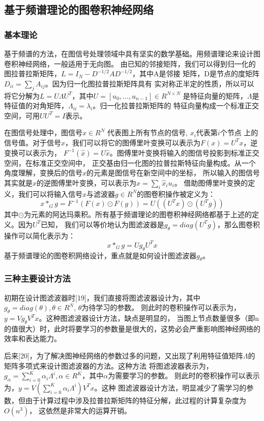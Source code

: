 \subsection{基于频谱理论的图卷积神经网络}
\subsubsection{基本理论}
基于频谱的方法，在图信号处理领域中具有坚实的数学基础。用频谱理论来设计图卷积神经网络，一般适用于无向图。
由已知的邻接矩阵，我们可以得到归一化的图拉普拉斯矩阵，$ L=I_N-D^{-1/2}AD^{-1/2} $，其中A是邻接
矩阵，D是节点的度矩阵 $ D_{ii}={\sum_{j}} A_{ij} $。因为归一化图拉普拉斯矩阵具有
实对称正半定的性质，所以可以将它分解为$ L=U\Lambda U^T $，其中$ U=[u_0,\ldots,u_{n-1}] \in R^{N \times N} $
是特征向量的矩阵，$ \Lambda $是特征值的对角矩阵，$\Lambda_{ii}=\lambda_{i} $。归一化拉普拉斯矩阵的
特征向量构成一个标准正交空间，可用$ UU^{T}=I $表示。

在图信号处理中，图信号$ x\in R^{N} $ 代表图上所有节点的信号, $ x_i $代表第$ i $个节点
上的信号值。对于信号$ x $，我们可以将它的图傅里叶变换可以表示为$ F(x)=U^{T}x $，逆变换可以表示为，
$ F^{-1} (\widehat{x}) = U\widehat{x} $。图傅里叶变换将输入的图信号投影到标准正交空间，在标准正交空间中，
正交基由归一化图的拉普拉斯特征向量构成。从一个角度理解，变换后的信号$ \widehat{x} $的元素是图信号在新空间中的坐标，
所以输入的图信号其实就是$ \widehat{x} $的逆图傅里叶变换，可以表示为$ x = {\sum_{i}}\widehat{x}_{i}u_{i} $。
借助图傅里叶变换的定义，我们可以将输入信号$ x $与滤波器$ g \in R^{N} $的图卷积操作被定义为：
$$ x\ast_{G}g = F^{-1}(F(x) \odot F(g)) = U((U^{T}x) \odot (U^{T}g)) $$
其中$ \odot $为元素的阿达玛乘积。所有基于频谱理论的图卷积神经网络都基于上述的定义。因为$U^{T}$已知，
我们可以等价地认为图滤波器是$ g_{\theta}=diag(U^{T}g) $，那么图卷积操作可以简化表示为：
$$ x\ast_{G}g = U g_{\theta} U^{T} x $$
基于频谱理论的图卷积网络设计，重点就是如何设计图滤波器$ g_{\theta} $。

\subsubsection{三种主要设计方法}
初期在设计图滤波器时[19]，我们直接将图滤波器设计为，其中$ g_{\theta} = diag(\theta),\theta \in R^N $, $ \theta $为待学习的参数。
则此时的卷积操作可以表示为，$ y = V g_{\theta} V^{T} x $。这种图滤波器设计方法，缺点是明显的，
当图上节点数量很多（即n的值很大）时，此时将要学习的参数量是很大的，这势必会严重影响图神经网络的效率和表达能力。

后来[20]，为了解决图神经网络的参数过多的问题，又出现了利用特征值矩阵$ \Lambda $的矩阵多项式来设计图滤波器的方法。这种方法
将图滤波器表示为，$ g_{\alpha} = {\sum_{i=0}^{K}} \alpha_{i} \Lambda^{i},  \alpha \in R^K $，其中$ \alpha $为需要学习的参数。
则此时的卷积操作可以表示为，$ y = V ({\sum_{i=0}^{K}} \alpha_{i} \Lambda^{i}) V^{T} x $。这种
图滤波器设计方法，明显减少了需学习的参数，但由于计算过程中涉及拉普拉斯矩阵的特征分解，此过程的计算复杂度为$ O(n^{3}) $，
这依然是非常大的运算开销。

